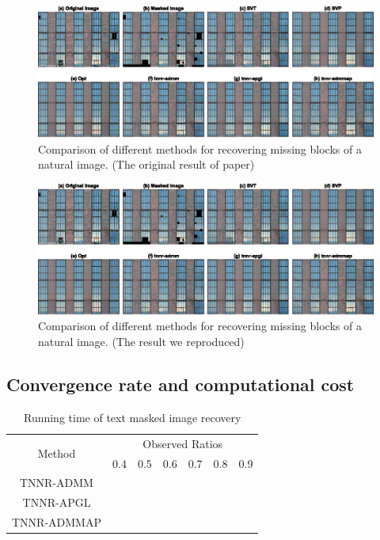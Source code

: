 \documentclass{article}
\begin{document}
{\begin{figure}[ht]
    \centering
    \includegraphics[]{./assets/fig9.eps}
    \caption{Comparison of different methods for recovering missing blocks of
        a natural image. (The original result of paper)\label{fig9ori}}
\end{figure}

\begin{figure}[ht]
    \centering
    \includegraphics[]{./assets/fig9.eps}
    \caption{Comparison of different methods for recovering missing blocks of
        a natural image. (The result we reproduced)\label{fig9}}
\end{figure}

\subsection{Convergence rate and computational cost}


\begin{table}
    \caption{Running time of text masked image recovery}
    \label{rcost}
    \centering
    \begin{tabular}{ccccccc}
        \toprule
        \multirow{2}{*}{Method} & \multicolumn{6}{c}{Observed Ratios} \\
        \cmidrule(r){2-7} 
        & 0.4 & 0.5 & 0.6 & 0.7 & 0.8  & 0.9 \\
        \midrule
        TNNR-ADMM &   &  & & & &   \\
        TNNR-APGL & & & & & &  \\
        TNNR-ADMMAP & & & & & &   \\
        \bottomrule
    \end{tabular}
\end{table}


}
\end{document}
